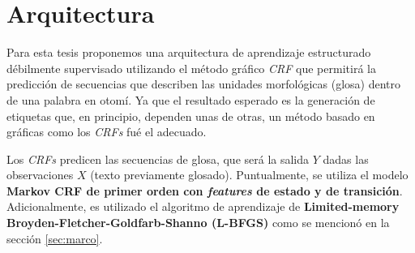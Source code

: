 \documentclass[letterpaper,12pt,oneside]{scrbook}
\theoremstyle{definition}
\begin{document}
	
	\section{Arquitectura}

	



















	
	Para esta tesis proponemos una arquitectura de aprendizaje estructurado débilmente supervisado utilizando el método gráfico \textit{CRF} que permitirá la predicción de secuencias que describen las unidades morfológicas (glosa) dentro de una palabra en otomí. Ya que el resultado esperado es la generación de etiquetas que, en principio, dependen unas de otras, un método basado en gráficas como los \textit{CRFs} fué el adecuado.

	
	Los \textit{CRFs} predicen las secuencias de glosa, que será la salida $Y$ dadas las observaciones $X$ (texto previamente glosado). Puntualmente, se utiliza el modelo \textbf{Markov CRF  de primer orden con \textit{features} de estado y de transición}. Adicionalmente, es utilizado el algoritmo de aprendizaje de \textbf{Limited-memory Broyden-Fletcher-Goldfarb-Shanno (L-BFGS)} como se mencionó en la sección \ref{sec:marco}.
\end{document}
